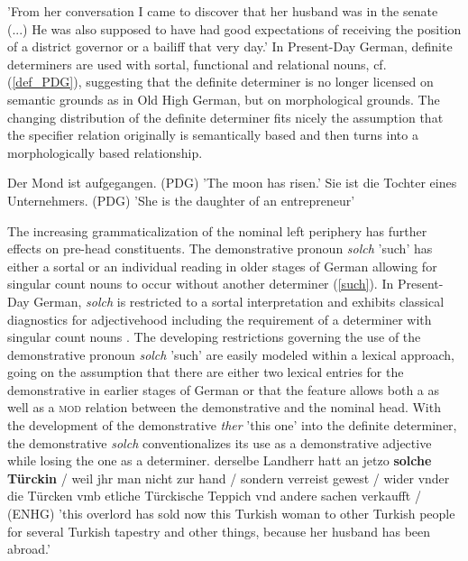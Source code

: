 \documentclass[output=paper]{langsci/langscibook}
\begin{document}
\glt 'From her conversation I came to discover that her husband was in the senate (...) He was also supposed to have had good expectations of receiving the position of a district governor or a bailiff that very day.'
\zl
In Present-Day German, definite determiners are used with sortal, functional and relational nouns, cf. (\ref{def_PDG}), suggesting that the definite determiner is no longer licensed on semantic grounds as in Old High German, but on morphological grounds. The changing distribution of the definite determiner fits nicely the assumption that the specifier relation originally is semantically based and then turns into a morphologically based relationship.

\eal \label{def_PDG}
\ex Der Mond ist aufgegangen. \hfill (PDG)
\glt 'The moon has risen.'
\ex Sie ist die Tochter eines Unternehmers. \hfill (PDG)
\glt 'She is the daughter of an entrepreneur'  
\zl

The increasing grammaticalization of the nominal left periphery has further effects on pre-head constituents. The demonstrative pronoun \textit{solch} 'such' has either a sortal or an individual reading in older stages of German allowing for singular count nouns to occur without another determiner (\ref{such}). In Present-Day German, \textit{solch} is restricted to a sortal interpretation and  exhibits classical diagnostics for adjectivehood including the requirement of a determiner with singular count nouns \citep{demske2005}. The developing restrictions governing the use of the demonstrative pronoun \textit{solch} 'such' are easily modeled within a lexical approach, going on the assumption that there are either two lexical entries for the demonstrative in earlier stages of German or that the \head feature allows both a \spr as well as a \textsc{mod} relation between the demonstrative and the nominal head. With the development of the demonstrative \textit{ther} 'this one' into the definite determiner, the demonstrative \textit{solch} conventionalizes its use as a demonstrative adjective while losing the one as a determiner. 
\ea \label{such}
derselbe Landherr hatt an jetzo \textbf{solche Türckin} / weil jhr man nicht zur hand / sondern verreist gewest / wider vnder die Türcken vmb etliche Türckische Teppich vnd andere sachen verkaufft /  \hfill (ENHG) 
\glt 'this overlord has sold now this Turkish woman to other Turkish people for several Turkish tapestry and other things, because her husband has been abroad.' 
\z
\end{document}
